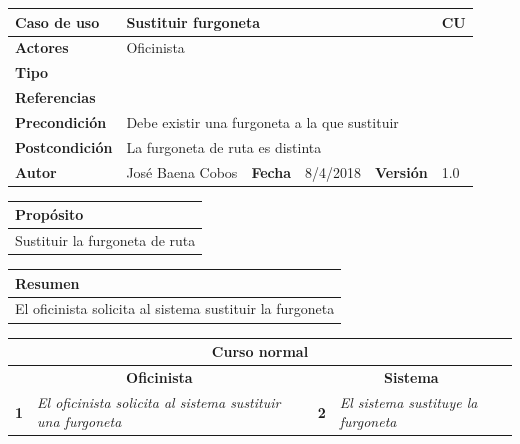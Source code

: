\documentclass[12pt,spanish]{article}
\begin{document}
\begin{table}[H]
	\centering
	\begin{tabular}{|m{3cm}|m{4cm}|m{2cm}|m{2cm}|m{2cm}|m{1cm}|}
		\hline
		\textbf{Caso de uso} &  \multicolumn{4}{m{11cm}|}{Sustituir furgoneta} \vline &  \cellcolor{gray!40}CU\arabic{contadorCU}  \stepcounter{contadorCU} \\
		\hline
		\textbf{Actores} & \multicolumn{5}{m{11cm}|}{Oficinista} \\
		\hline
		\textbf{Tipo} & \multicolumn{5}{m{11cm}|}{} \\
		\hline
		\textbf{Referencias} &\multicolumn{5}{m{11cm}|}{} \\
		\hline
		\textbf{Precondición} & \multicolumn{5}{m{11cm}|}{Debe existir una furgoneta a la que sustituir} \\
		\hline
		\textbf{Postcondición} & \multicolumn{5}{m{11cm}|}{La furgoneta de ruta es distinta} \\
		\hline
		\textbf{Autor} & José Baena Cobos & \textbf{Fecha} & 8/4/2018 & \textbf{Versión} & 1.0 \\
		\hline
	\end{tabular}
	
	\vspace{1cm}
	
	\begin{tabular}{|m{16.2cm}|}
		\hline
		\textbf{Propósito} \\
		\hline
		Sustituir la furgoneta de ruta\\
		\hline
	\end{tabular}
	
	\vspace{1cm}
	
	\begin{tabular}{|m{16.2cm}|}
		\hline
		\textbf{Resumen} \\
		\hline
		El oficinista solicita al sistema sustituir la furgoneta\\
		\hline
	\end{tabular}
	
	\vspace{1cm}
	
	\begin{tabular}{|m{5pt}|m{7.33cm}|m{5pt}|m{7.33cm}|}
		\hline
		\multicolumn{4}{|c|}{\textbf{Curso normal}} \\
		\hline
		\multicolumn{2}{|c}{\textbf{Oficinista}} & \multicolumn{2}{|c|}{\textbf{Sistema}} \\
		\hline
		\textbf{1} & \textit{El oficinista solicita al sistema sustituir una furgoneta} & \textbf{2} & \textit{El sistema sustituye la furgoneta} \\
		\hline
	

\end{tabular}
\end{table}
\end{document}
